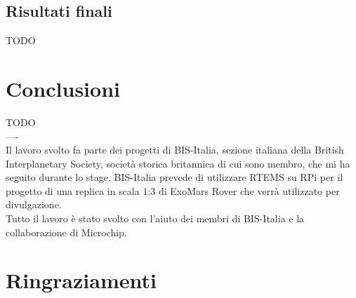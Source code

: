 \documentclass[12pt, a4paper, titlepage, oneside]{book}
\begin{document}
\begin{flushleft}
\section{Risultati finali}
TODO\\
\chapter{Conclusioni}
TODO\\
----\\

Il lavoro svolto fa parte dei progetti di BIS-Italia, sezione italiana della British Interplanetary Society, società storica britannica di cui sono membro, che mi ha seguito durante lo stage. BIS-Italia prevede di utilizzare RTEMS su RPi per il progetto di una replica in scala 1:3 di ExoMars Rover che verrà utilizzato per divulgazione.\\
Tutto il lavoro è stato svolto con l'aiuto dei membri di BIS-Italia e la collaborazione di Microchip.
\chapter*{Ringraziamenti}
\printbibliography
\end{flushleft}
\end{document}

